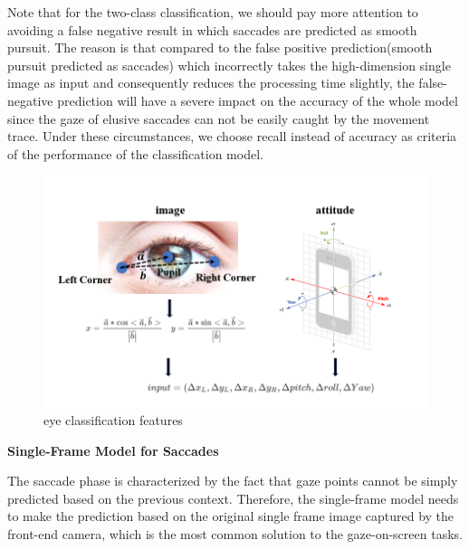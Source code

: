\documentclass[acmlarge]{acmart}
\begin{document}
Note that for the two-class classification, we should pay more attention to avoiding a false negative result in which saccades are predicted as smooth pursuit. The reason is that compared to the false positive prediction(smooth pursuit predicted as saccades) which incorrectly takes the high-dimension single image as input and consequently reduces the processing time slightly, the false-negative prediction will have a severe impact on the accuracy of the whole model since the gaze of elusive saccades can not be easily caught by the movement trace. Under these circumstances, we choose recall instead of accuracy as criteria of the performance of the classification model.

\begin{figure}
  \centering
  \includegraphics[scale=0.55]{pictures/eyeClassificationInput.jpg}
  \caption{eye classification features}
  \label{eyeClassificationInput}
\end{figure}

\textbf{Single-Frame Model for Saccades} \label{model:saccade}

The saccade phase is characterized by the fact that gaze points cannot be simply predicted based on the previous context. Therefore, the single-frame model needs to make the prediction based on the original single frame image captured by the front-end camera, which is the most common solution to the gaze-on-screen tasks.

\end{document}
